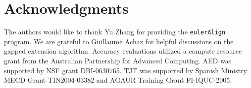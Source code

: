 \documentclass{llncs}
\begin{document}
\section{ Acknowledgments }
The authors would like to thank Yu Zhang for providing the
\texttt{eulerAlign} program. We are grateful to Guillaume Achaz for
helpful discussions on the gapped extension algorithm. Accuracy
evaluations utilized a compute resource grant from the Australian
Partnership for Advanced Computing.  AED was supported by NSF grant
DBI-0630765. TJT was supported by Spanish Ministry MECD Grant
TIN2004-03382 and AGAUR Training Grant FI-IQUC-2005.




\end{document}
